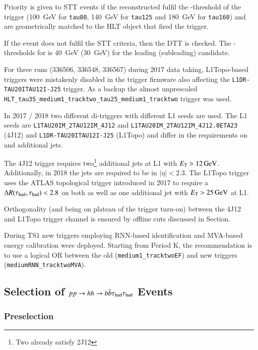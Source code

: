 Priority is given to STT events if the reconstructed \tauhad fulfil the
\pT-threshold of the trigger (\SI{100}{\GeV} for \verb|tau80|, \SI{140}{\GeV}
for \verb|tau125| and \SI{180}{\GeV} for \verb|tau160|) and are geometrically
matched to the HLT object that fired the trigger.

If the event does not fulfil the STT criteria, then the DTT is checked. The
\pT-thresholds for \tauhadvis is \SI{40}{\GeV} (\SI{30}{\GeV}) for the leading
(subleading) \tauhadvis candidate.

For three runs (336506, 336548, 336567) during 2017 data taking, L1Topo-based
triggers were mistakenly disabled in the trigger firmware also affecting the
\verb|L1DR-TAU20ITAU12I-J25| trigger. As a backup the almost unprescaled
\verb|HLT_tau35_medium1_tracktwo_tau25_medium1_tracktwo| trigger was used.

In 2017 / 2018 two different di-\tauhad triggers with different L1 seeds are
used. The L1 seeds are \verb|L1TAU20IM_2TAU12IM_4J12| and
\verb|L1TAU20IM_2TAU12IM_4J12.0ETA23| (4J12) and \verb|L1DR-TAU20ITAU12I-J25|
(L1Topo) and differ in the requirements on \tauhadvis and additional jets.

The 4J12 trigger requires two\footnote{Two \tauhadvis already satisfy 2J12}
additional jets at L1 with $\ET > \SI{12}{\GeV}$. Additionally, in 2018 the jets
are required to be in $|\eta| < 2.3$. The L1Topo trigger uses the ATLAS
topological trigger introduced in 2017 to require a $\Delta R(\tau_{\text{had}}, \tau_{\text{had}})
< 2.8$ on both \tauhad as well as one additional jet with $E_{\text{T}} > \SI{25}{\ensuremath{\text{GeV}}}$
at L1.

Orthogonality (and being on plateau of the trigger turn-on) between the 4J12 and
L1Topo trigger channel is ensured by offline cuts discussed in
Section.%

During TS1 new \tauhadvis triggers employing RNN-based \tauhad identification
and MVA-based energy calibration were deployed. Starting from Period K, the
recommendation is to use a logical OR between the old
(\verb|medium1_tracktwoEF|) and new triggers (\verb|mediumRNN_tracktwoMVA|).


\subsection{Selection of $pp \rightarrow hh \rightarrow b\bar{b}\tau_{\text{had}}\tau_{\text{had}}$ Events}
\label{sec:reconstruction_of_higgs_candidates}




\subsubsection{Preselection}

